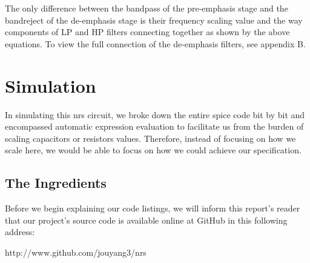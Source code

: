 \documentclass[a4paper]{IEEEtran}
\begin{document}
			The only difference between the bandpass of the pre-emphasis stage and the bandreject of the de-emphasis stage is their frequency scaling value and the way components of LP and HP filters connecting together as shown by the above equations. To view the full connection of the de-emphasis filters, see appendix B.
		
	\section{Simulation}
		In simulating this nrs circuit, we broke down the entire spice code bit by bit and encompassed automatic expression evaluation to facilitate us from the burden of scaling capacitors or resistors values. Therefore, instead of focusing on how we scale here, we would be able to focus on how we could achieve our specification.
		
		\subsection{The Ingredients}
		Before we begin explaining our code listings, we will inform this report's reader that our project's source code is available online at GitHub in this following address:
		\begin{center}
			http://www.github.com/jouyang3/nrs
		\end{center}
		
\end{document}
